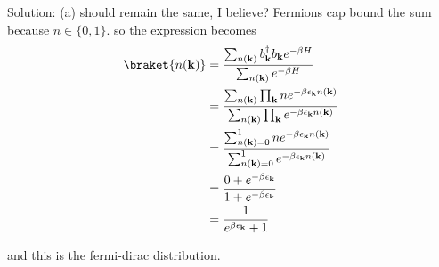 \begin{homeworkProblem}
\begin{itemize}
\begin{callout}{Solution:}
                (a) should remain the same, I believe? Fermions cap bound the sum because $n\in\{0,1\}$. 
                so the expression becomes
                \begin{align*}
                    \braket{n(\mathbf{k})} &= \frac{\sum_{n(\mathbf{k})} b_{\mathbf k}^{\dagger} b_{\mathbf k} e^{-\beta H}} {\sum_{n(\mathbf{k})} e^{-\beta H}} \\ 
                                           &= \frac{\sum_{n(\mathbf{k})} \prod_{\mathbf{k}} n e^{-\beta \epsilon_{\mathbf k}n(\mathbf{k})} }{\sum_{n(\mathbf{k})} \prod_{\mathbf{k}} e^{-\beta \epsilon_{\mathbf k}n(\mathbf{k})} } \\ 
                                           &= \frac{\sum_{n(\mathbf{k})=0}^{1} n e^{-\beta \epsilon_{\mathbf k}n(\mathbf{k})} }{\sum_{n(\mathbf{k})=0}^{1} e^{-\beta \epsilon_{\mathbf k}n(\mathbf{k})} } \\ 
                                           &= \frac{0 + e^{-\beta \epsilon_{\mathbf{k}}}}{1 + e^{-\beta \epsilon_{\mathbf{k}}}} \\
                                           &= \frac{1}{e^{\beta \epsilon_{\mathbf{k}}}+1}
                \end{align*}
                
                and this is the fermi-dirac distribution.

            \end{callout}
    \end{itemize}
\end{homeworkProblem}
